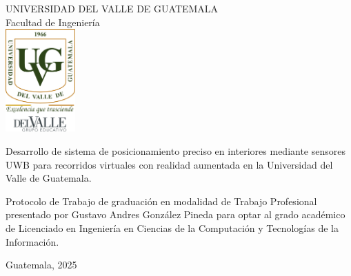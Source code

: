 \documentclass{article}
\begin{document}
\begin{center}
\begin{doublespace}
    \thispagestyle{empty}  %
    \Large{UNIVERSIDAD DEL VALLE DE GUATEMALA}\\
    Facultad de Ingeniería \\    

    \vspace{15mm} 
    \includegraphics[width=0.2\textwidth]{images/Uvg_logo.jpg}

    \vspace{15mm} 
    {\Large Desarrollo de sistema de posicionamiento preciso en interiores mediante sensores UWB para recorridos virtuales con realidad aumentada en la Universidad del Valle de Guatemala.}

    \vspace{10mm} 
    {\Large Protocolo de Trabajo de graduación en modalidad de Trabajo Profesional presentado por Gustavo Andres González Pineda para optar al grado académico de Licenciado en Ingeniería en Ciencias de la Computación y Tecnologías de la Información.}

    {\Large Guatemala,  2025}
    
\end{doublespace}
\end{center}

\tableofcontents
\newpage

\setcounter{page}{1} %
\end{document}
